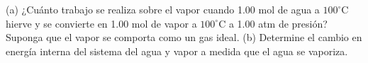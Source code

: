 \item (a) ¿Cuánto trabajo se realiza sobre el vapor cuando 1.00 mol de agua a $100^\circ\text{C}$ hierve y se convierte en 1.00 mol de vapor a $100^\circ\text{C}$ a 1.00 atm de presión? Suponga que el vapor se comporta como un gas ideal. (b) Determine el cambio en energía interna del sistema del agua y vapor a medida que el agua se vaporiza.
